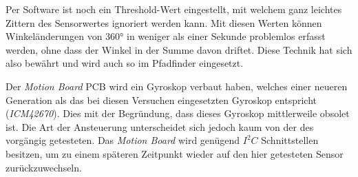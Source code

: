 \documentclass[main.tex]{subfiles} %
\begin{document}
Per Software ist noch ein Threshold-Wert eingestellt, mit welchem ganz leichtes
Zittern des Sensorwertes ignoriert werden kann. Mit diesen Werten können
Winkeländerungen von 360° in weniger als einer Sekunde problemlos erfasst
werden, ohne dass der Winkel in der Summe davon driftet. Diese Technik hat sich
also bewährt und wird auch so im Pfadfinder eingesetzt.

Der \textit{Motion Board} PCB wird ein Gyroskop verbaut haben, welches einer
neueren Generation als das bei diesen Versuchen eingesetzten Gyroskop
entspricht (\textit{ICM42670}). Dies mit der Begründung, dass dieses Gyroskop
mittlerweile obsolet ist. Die Art der Ansteuerung unterscheidet sich jedoch
kaum von der des vorgängig getesteten. Das \textit{Motion Board} wird genügend
$I^2C$ Schnittstellen besitzen, um zu einem späteren Zeitpunkt wieder auf den
hier getesteten Sensor zurückzuwechseln.
\end{document}
